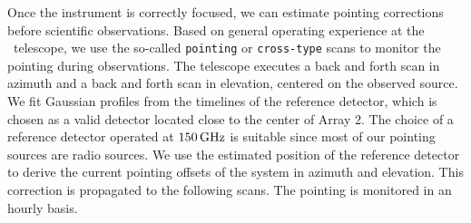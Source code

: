 Once the instrument is correctly focused, we can estimate pointing corrections
before scientific observations.
%
%
%
%
Based on general operating experience at the \trentemetre\ telescope, we use the so-called
{\tt pointing} or {\tt cross-type} scans to monitor the pointing during observations. The
telescope executes a back and forth scan in azimuth and a back and forth scan in
elevation, centered on the observed source. We fit Gaussian profiles
from the timelines of the reference detector, which is chosen as a
valid detector located close to the center of Array 2. {The choice of
a reference detector operated at $150\,\rm{GHz}$ is suitable since most
of our pointing sources are radio sources.} We use the
estimated position of the reference detector to derive the current pointing
offsets of the system in azimuth and elevation. This correction is
propagated to the following scans. The pointing is monitored in an
hourly basis.

